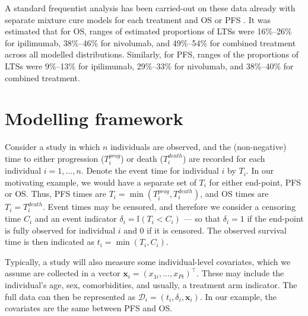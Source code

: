 \documentclass[AMA,STIX1COL]{WileyNJD-v2}
\begin{document}
A standard frequentist analysis has been carried-out on these data already with separate mixture cure models for each treatment and OS or PFS \cite{Mohr2020}.
It was estimated that for OS, ranges of estimated proportions of LTSs were 16\%–26\% for ipilimumab, 38\%–46\% for nivolumab, and 49\%–54\% for combined treatment across all modelled distributions.
Similarly, for PFS, ranges of the proportions of LTSs were 9\%–13\% for ipilimumab, 29\%–33\% for nivolumab, and 38\%–40\% for combined treatment.

%
\section{Modelling framework}\label{sec:methods}
Consider a study in which $n$ individuals are observed, and the (non-negative) time to either progression ($T^{prog}_{i}$) or death ($T^{death}_{i}$) are recorded for each individual $i=1,\ldots,n$.
Denote the event time for individual $i$ by $T_{i}$.
In our motivating example, we would have a separate set of $T_{i}$ for either end-point, PFS or OS.
Thus, PFS times are $T_{i} = \min(T^{prog}_{i}, T^{death}_{i})$, and OS times are $T_{i} = T^{death}_{i}$.
Event times may be censored, and therefore we consider a censoring time $C_{i}$ and an event indicator $\delta_{i} = \mathbb{I}(T_{i} < C_{i})$
--- so that $\delta_{i} = 1$ if the end-point is fully observed for individual $i$ and 0 if it is censored.
The observed survival time is then indicated as $t_{i} = \min(T_{i}, C_{i})$.

Typically, a study will also measure some individual-level covariates, which we assume are collected in a vector $\bm{x}_{i} = (x_{1i}, \ldots, x_{Pi})^\top$.
These may include the individual's age, sex, comorbidities, and usually, a treatment arm indicator.
The full data can then be represented as
$\mathcal{D}_i = (t_i, \delta_i, \bm{x}_i)$.
In our example, the covariates are the same between PFS and OS.
\end{document}
